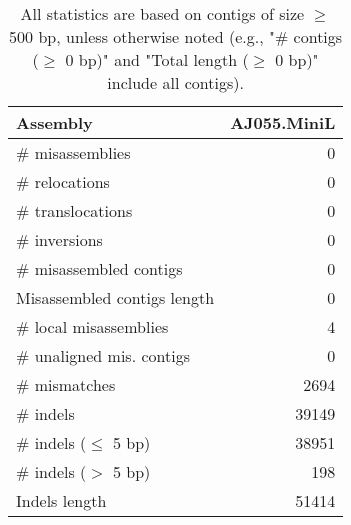 \documentclass[12pt,a4paper]{article}
\begin{document}
\begin{table}[ht]
\begin{center}
\caption{All statistics are based on contigs of size $\geq$ 500 bp, unless otherwise noted (e.g., "\# contigs ($\geq$ 0 bp)" and "Total length ($\geq$ 0 bp)" include all contigs).}
\begin{tabular}{|l*{1}{|r}|}
\hline
Assembly & AJ055.MiniL \\ \hline
\# misassemblies & 0 \\ \hline
\hspace{5mm}\# relocations & 0 \\ \hline
\hspace{5mm}\# translocations & 0 \\ \hline
\hspace{5mm}\# inversions & 0 \\ \hline
\# misassembled contigs & 0 \\ \hline
Misassembled contigs length & 0 \\ \hline
\# local misassemblies & 4 \\ \hline
\# unaligned mis. contigs & 0 \\ \hline
\# mismatches & 2694 \\ \hline
\# indels & 39149 \\ \hline
\hspace{5mm}\# indels ($\leq$ 5 bp) & 38951 \\ \hline
\hspace{5mm}\# indels ($>$ 5 bp) & 198 \\ \hline
Indels length & 51414 \\ \hline
\end{tabular}
\end{center}
\end{table}
\end{document}
